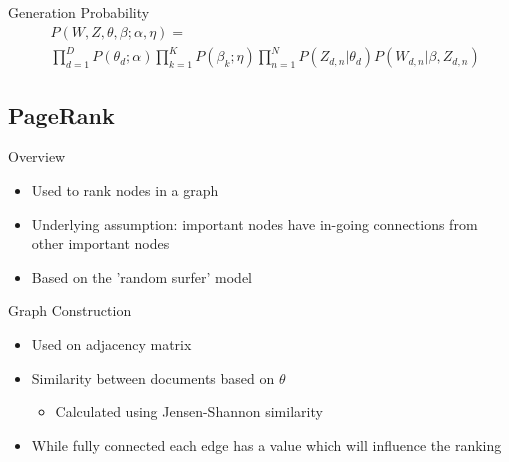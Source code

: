 \begin{frame}{\insertsubsection}{Generation Probability}
	\begin{align*}
		& P(W,Z,\theta,\beta;\alpha,\eta) = \\
		& \prod_{d=1}^{D}P(\theta_d;\alpha)
		\prod_{k=1}^{K}P(\beta_k;\eta)
		\prod_{n=1}^{N}P(Z_{d,n}|\theta_d) P(W_{d,n}|\beta, Z_{d,n})
	\end{align*}
\end{frame}


\subsection{PageRank}
\begin{frame}{\insertsubsection}{Overview}
	\begin{itemize}
		\item Used to rank nodes in a graph
		\item Underlying assumption: important nodes have in-going connections from other important nodes
		\item Based on the 'random surfer' model
	\end{itemize}
\end{frame}


\begin{frame}{\insertsubsection}{Graph Construction}
	\begin{itemize}
		\item Used on adjacency matrix
		\item Similarity between documents based on $\theta$
		\begin{itemize}
			\item Calculated using Jensen-Shannon similarity
		\end{itemize}
		\item While fully connected each edge has a value which will influence the ranking
	\end{itemize}
\end{frame}
